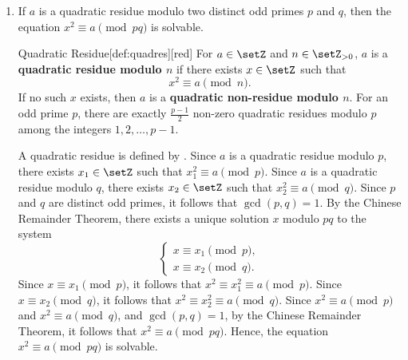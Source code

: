 \begin{enumerate}
  
  \newpage
  \item If $a$ is a quadratic residue modulo two distinct odd primes $p$ and $q$, 
  then the equation $x^{2} \equiv a \pmod{pq}$ is solvable.
  \begin{define}{Quadratic Residue}[def:quadres][red]
    For $a\in\setZ$ and $n\in\setZ_{>0}$, $a$ is a \textbf{quadratic residue modulo $n$} if there exists $x\in\setZ$ such that
    \[
    x^2 \equiv a \pmod{n}.
    \]
    If no such $x$ exists, then $a$ is a \textbf{quadratic non-residue modulo $n$}.
    For an odd prime $p$, there are exactly $\frac{p-1}{2}$ non-zero quadratic residues modulo $p$ among the integers $1, 2, \ldots, p-1$.
  \end{define}
  \begin{subprove}
    A quadratic residue is defined by . 
    Since $a$ is a quadratic residue modulo $p$, there exists $x_1 \in \setZ$ such that $x_1^2 \equiv a \pmod{p}$.
    Since $a$ is a quadratic residue modulo $q$, there exists $x_2 \in \setZ$ such that $x_2^2 \equiv a \pmod{q}$.
    Since $p$ and $q$ are distinct odd primes, it follows that $\gcd(p, q) = 1$. 
    By the Chinese Remainder Theorem, there exists a unique solution $x$ modulo $pq$ to the system
    \[
    \begin{cases}
    x \equiv x_1 \pmod{p},\\
    x \equiv x_2 \pmod{q}.
    \end{cases}
    \]
    Since $x \equiv x_1 \pmod{p}$, it follows that $x^2 \equiv x_1^2 \equiv a \pmod{p}$.
    Since $x \equiv x_2 \pmod{q}$, it follows that $x^2 \equiv x_2^2 \equiv a \pmod{q}$.
    Since $x^2 \equiv a \pmod{p}$ and $x^2 \equiv a \pmod{q}$, and $\gcd(p, q) = 1$, by the Chinese Remainder Theorem, it follows that $x^2 \equiv a \pmod{pq}$.
    Hence, the equation $x^2 \equiv a \pmod{pq}$ is solvable.
  \end{subprove}
  

\end{enumerate}
